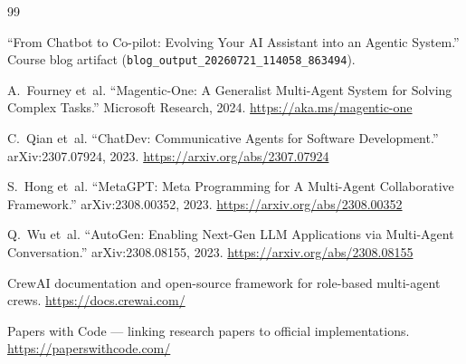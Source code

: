 \documentclass[11pt,a4paper]{article}
\begin{document}
\begin{thebibliography}{99}

``From Chatbot to Co-pilot: Evolving Your AI Assistant into an Agentic System.''
Course blog artifact (\texttt{blog\_output\_20260721\_114058\_863494}).

A.~Fourney et~al.
``Magentic-One: A Generalist Multi-Agent System for Solving Complex Tasks.''
Microsoft Research, 2024.
\url{https://aka.ms/magentic-one}

C.~Qian et~al.
``ChatDev: Communicative Agents for Software Development.''
arXiv:2307.07924, 2023.
\url{https://arxiv.org/abs/2307.07924}

S.~Hong et~al.
``MetaGPT: Meta Programming for A Multi-Agent Collaborative Framework.''
arXiv:2308.00352, 2023.
\url{https://arxiv.org/abs/2308.00352}

Q.~Wu et~al.
``AutoGen: Enabling Next-Gen LLM Applications via Multi-Agent Conversation.''
arXiv:2308.08155, 2023.
\url{https://arxiv.org/abs/2308.08155}

CrewAI documentation and open-source framework for role-based multi-agent crews.
\url{https://docs.crewai.com/}

Papers with Code --- linking research papers to official implementations.
\url{https://paperswithcode.com/}

\end{thebibliography}
\end{document}
